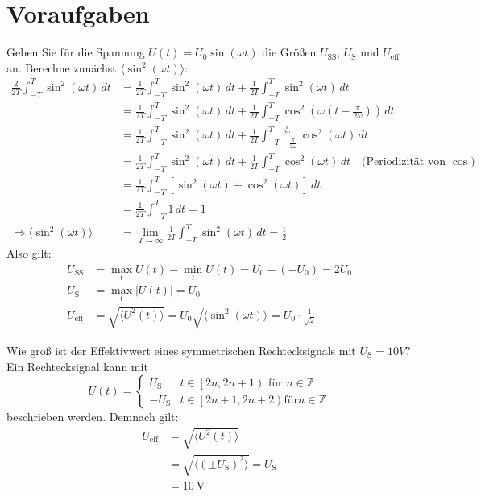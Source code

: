 \documentclass[ngerman]{scrartcl}
\theoremstyle{definition}
\begin{document}
	\section{Voraufgaben}
		\begin{voraufgabe}{Geben Sie für die Spannung $U(t) = U_0 \sin(\omega t)$ die Größen $U_\mathrm{SS}$, $U_\mathrm{S}$ und $U_\mathrm{eff}$ an.}
			Berechne zunächst $\langle \sin^2(\omega t) \rangle$:
			\begin{align*}
    \frac{2}{2T}\int_{-T}^T \sin^2(\omega t)\,dt 
    &= \frac{1}{2T}\int_{-T}^T \sin^2(\omega t)\,dt + \frac{1}{2T}\int_{-T}^T \sin^2(\omega t)\,dt \\
    &= \frac{1}{2T}\int_{-T}^T \sin^2(\omega t)\,dt + \frac{1}{2T}\int_{-T}^T \cos^2\left(\omega\left(t - \frac{\pi}{2\omega}\right)\right)\,dt \\
    &= \frac{1}{2T}\int_{-T}^T \sin^2(\omega t)\,dt + \frac{1}{2T}\int_{-T - \frac{\pi}{2\omega}}^{T - \frac{\pi}{2\omega}} \cos^2(\omega t)\,dt \\
    &= \frac{1}{2T}\int_{-T}^T \sin^2(\omega t)\,dt + \frac{1}{2T}\int_{-T}^{T} \cos^2(\omega t)\,dt \quad \text{(Periodizität von } \cos) \\
    &= \frac{1}{2T}\int_{-T}^T \left[\sin^2(\omega t) + \cos^2(\omega t)\right]\,dt \\
    &= \frac{1}{2T}\int_{-T}^T 1\,dt = 1 \\
    \Rightarrow \langle \sin^2(\omega t) \rangle &= \lim_{T \to \infty} \frac{1}{2T}\int_{-T}^T \sin^2(\omega t)\,dt = \frac{1}{2}
\end{align*}
Also gilt:
\begin{align*}
    U_\mathrm{SS} &= \max_t U(t) - \min_t U(t) = U_0 - (-U_0) = 2U_0 \\
    U_\mathrm{S} &= \max_t |U(t)| = U_0 \\
    U_\mathrm{eff} &= \sqrt{\langle U^2(t) \rangle} = U_0 \sqrt{\langle \sin^2(\omega t) \rangle} = U_0 \cdot \frac{1}{\sqrt{2}}
\end{align*}
		\end{voraufgabe}		
		\begin{voraufgabe}{Wie groß ist der Effektivwert eines symmetrischen Rechtecksignals mit $U_\mathrm{S} = 10 V?$}
			Ein Rechtecksignal kann mit 
			\begin{equation*}
				 U(t) = \begin{cases}
				U_\mathrm{S} & t \in \left[2n,2n+1\right) \text{ für } n \in \mathbb{Z}\\
				-U_\mathrm{S} & t \in \left[2n+1,2n+2\right) \mathrm{für} n \in \mathbb{Z}
			\end{cases}
			\end{equation*}
			beschrieben werden. Demnach gilt:
			\begin{align*}
				U_\mathrm{eff} &= \sqrt{\langle U^2(t) \rangle} \\
				&= \sqrt{\langle (\pm U_\mathrm{S})^2 \rangle}= U_\mathrm{S} \\
				&= \SI{10}{\volt}
			\end{align*}
		\end{voraufgabe}	
\end{document}
